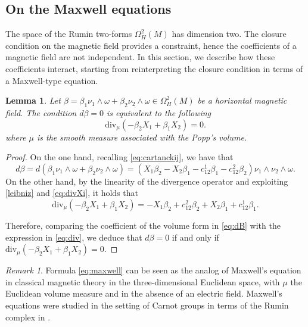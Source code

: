 \documentclass{amsart}
\theoremstyle{plain}
\newtheorem{lemma}[theorem]{Lemma}
\theoremstyle{definition}
\theoremstyle{remark}
\newtheorem{remark}[thm]{Remark}
\newcommand{\diff}{d}%
\newcommand{\B}{\beta}
\newcommand{\mg}{\B_1\nu_1\wedge \omega
										+\B_2\nu_2\wedge \omega}	%
\begin{document}
\subsection{On the Maxwell equations}
The space of the Rumin two-forms $\Omega^2_H(M)$ has dimension two. The closure condition on the magnetic field provides a constraint, hence the coefficients of a magnetic field are not independent.  
In this section, we describe how these coefficients interact, starting from reinterpreting the closure condition in terms of a Maxwell-type equation. 


\begin{lemma}
Let $\B=\mg\in \Omega^2_H(M)$ be a horizontal magnetic field.
The condition $\diff \B =0$ is equivalent to the following
\begin{equation}
\label{eq:maxwell}
	\mathrm{div}_{\mu}(-\B_2X_1+\B_1X_2)=0.
\end{equation}
where $\mu$ is the smooth measure associated with the Popp's volume.
\end{lemma}

\begin{proof}
On the one hand, recalling \eqref{eq:cartanckij}, we have that 
\begin{equation} \label{eq:dB}
\diff\B=\diff\left(\mg\right)=\left(X_1\B_2-X_2\B_1-c^1_{12}\B_1-c^2_{12}\B_2\right)\nu_1\wedge\nu_2\wedge\omega.
\end{equation}
On the other hand, by  the linearity of the divergence operator and exploiting \eqref{leibniz} and \eqref{eq:divXi}, it holds that 
\begin{equation} \label{eq:div}
\mathrm{div}_\mu(-\B_2X_1+\B_1X_2)%
= -X_1\B_2+c^2_{12}\B_2+X_2\B_1+c^1_{12}\B_1.
\end{equation}

Therefore, comparing the coefficient of the volume form in \eqref{eq:dB} with the expression in \eqref{eq:div}, we deduce that $\diff\B=0$ if and only if $\mathrm{div}_\mu(-\B_2X_1+\B_1X_2)=0$.
\end{proof}






\begin{remark} 
Formula \eqref{eq:maxwell} can be seen as the analog of Maxwell's equation in classical magnetic theory in the three-dimensional Euclidean space, with $\mu$  the Euclidean volume measure and in the absence of an electric field. 
Maxwell's equations were studied in the setting of Carnot groups in terms of the Rumin complex in \cite{FT12}.
\end{remark}
\end{document}
